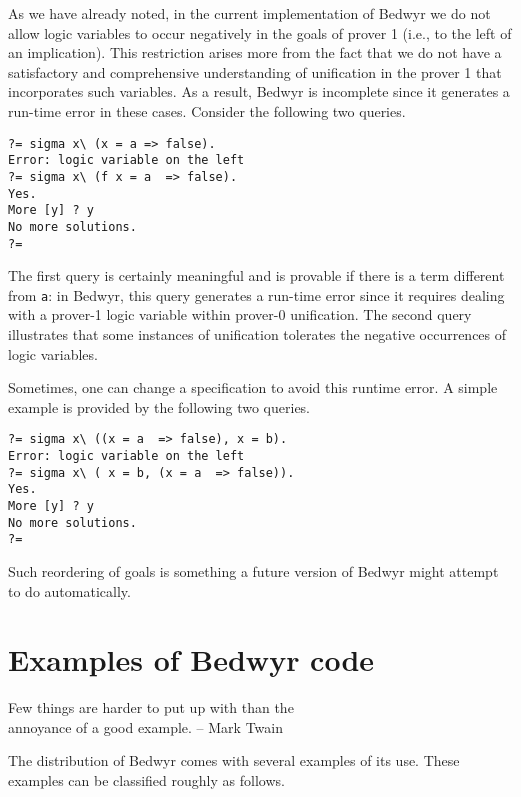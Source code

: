 \documentclass{article}
\begin{document}
As we have already noted, in the current implementation of Bedwyr
we do not allow logic variables to occur negatively in the goals of
prover 1 (i.e., to the left of an implication). 
This restriction arises more from the fact that we do not
have a satisfactory and comprehensive understanding of unification in
the prover 1 that incorporates such variables.  As a result, Bedwyr
is incomplete since it generates a run-time error in these cases.
Consider the following two queries.
\begin{verbatim}
?= sigma x\ (x = a => false).
Error: logic variable on the left
?= sigma x\ (f x = a  => false).
Yes.
More [y] ? y
No more solutions.
?=
\end{verbatim}
The first query is certainly meaningful and is provable if there is a
term different from {\tt a}: in Bedwyr, this query generates a
run-time error since it requires dealing with a prover-1 logic
variable within prover-0 unification.  The second query illustrates
that some instances of unification tolerates the negative 
occurrences of logic variables.

Sometimes, one can change a specification to avoid this runtime
error.  A simple example is provided by the following two queries.
\begin{verbatim}
?= sigma x\ ((x = a  => false), x = b).
Error: logic variable on the left
?= sigma x\ ( x = b, (x = a  => false)).
Yes.
More [y] ? y
No more solutions.
?= 
\end{verbatim}
Such reordering of goals is something a future version of Bedwyr might
attempt to do automatically.

\section{Examples of Bedwyr code}

\begin{flushright}
Few things are harder to put up with than the\\
annoyance of a good example.   -- Mark Twain
\end{flushright}

The distribution of Bedwyr comes with several examples of its use.
These examples can be classified roughly as follows.
\end{document}
